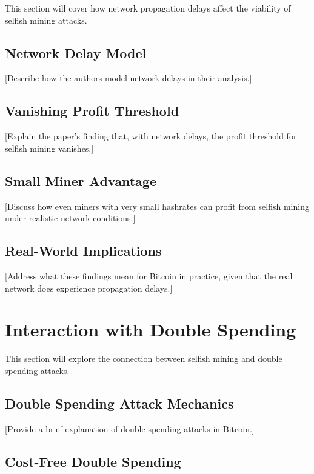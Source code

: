 \documentclass[conference]{IEEEtran}
\begin{document}
This section will cover how network propagation delays affect the viability of selfish mining attacks.

\subsection{Network Delay Model}

[Describe how the authors model network delays in their analysis.]

\subsection{Vanishing Profit Threshold}

[Explain the paper's finding that, with network delays, the profit threshold for selfish mining vanishes.]

\subsection{Small Miner Advantage}

[Discuss how even miners with very small hashrates can profit from selfish mining under realistic network conditions.]

\subsection{Real-World Implications}

[Address what these findings mean for Bitcoin in practice, given that the real network does experience propagation delays.]

\section{Interaction with Double Spending}

This section will explore the connection between selfish mining and double spending attacks.

\subsection{Double Spending Attack Mechanics}

[Provide a brief explanation of double spending attacks in Bitcoin.]

\subsection{Cost-Free Double Spending}
\end{document}
